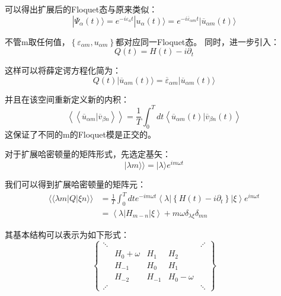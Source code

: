 \documentclass{article}
\begin{document}
    可以得出扩展后的Floquet态与原来类似：
    \begin{equation}
        | \Psi_{\alpha}(t) \rangle=e^{-i \varepsilon_{a} t} | u_{\alpha}(t) \rangle=e^{-i \overline{\varepsilon}_{\alpha m} t} | \overline{u}_{\alpha m}(t) \rangle
    \end{equation}

    不管m取任何值，$\left\{\varepsilon_{\alpha m}, u_{\alpha m}\right\}$都对应同一Floquet态。
    同时，进一步引入：
    \begin{equation}
        Q(t)=H(t)-i \partial_{t}
    \end{equation}

    这样可以将薛定谔方程化简为：
    \begin{equation}
        Q(t) | \overline{u}_{\alpha m}(t) \rangle=\overline{\varepsilon}_{\alpha m} | \overline{u}_{\alpha m}(t) \rangle
    \end{equation}

    并且在该空间重新定义新的内积：
    \begin{equation}
        \left\langle\left\langle\overline{u}_{\alpha m} | \overline{v}_{\beta n}\right\rangle\right\rangle=\frac{1}{T} \int_{0}^{T} d t\left\langle\overline{u}_{\alpha m}(t) | \overline{v}_{\beta n}(t)\right\rangle
    \end{equation}
    这保证了不同的m的Floquet模是正交的。

    对于扩展哈密顿量的矩阵形式，先选定基矢：
    \begin{equation}
        | \lambda m \rangle \rangle=| \lambda \rangle e^{i m \omega t}
    \end{equation}

    我们可以得到扩展哈密顿量的矩阵元：
    \begin{equation}
    \begin{aligned}\langle\langle\lambda m|Q| \xi n\rangle\rangle &=\frac{1}{T} \int_{0}^{T} d t e^{-i m \omega t}\left\langle\lambda\left|\left\{H(t)-i \partial_{t}\right\}\right| \xi\right\rangle e^{i n \omega t} \\ &=\left\langle\lambda\left|H_{m-n}\right| \xi\right\rangle+ m \omega \delta_{\lambda \xi} \delta_{m n} \end{aligned}
    \end{equation}

    其基本结构可以表示为如下形式：
    \begin{equation}
        \left\{
            \begin{matrix}
            \ddots  &               &           &               & \iddots    \\ 
                    & H_0 + \omega  &   H_1     & H_2           &           \\
                    & H_{-1}        &   H_0     & H_1           &           \\
                    & H_{-2}        &   H_{-1}  & H_0 - \omega  &           \\
            \iddots  &               &           &               & \ddots    
            \end{matrix}
        \right\}
    \end{equation}
    
\end{document}

